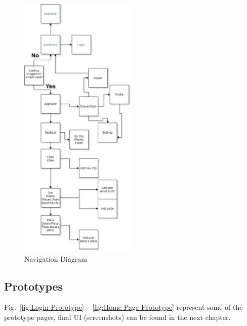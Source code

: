 \begin{figure}[ht]
    \centering
    \includegraphics[width=0.5\textwidth]{img/nav_diagram .png}
     \caption{Navigation Diagram}
    \label{fig:Navigation Diagram}
\end{figure}



\subsection{Prototypes}
Fig.~\ref{fig:Login Prototype} -~\ref{fig:Home Page Prototype} represent some of the prototype pages, final UI (screenshots) can be found in the next chapter.

